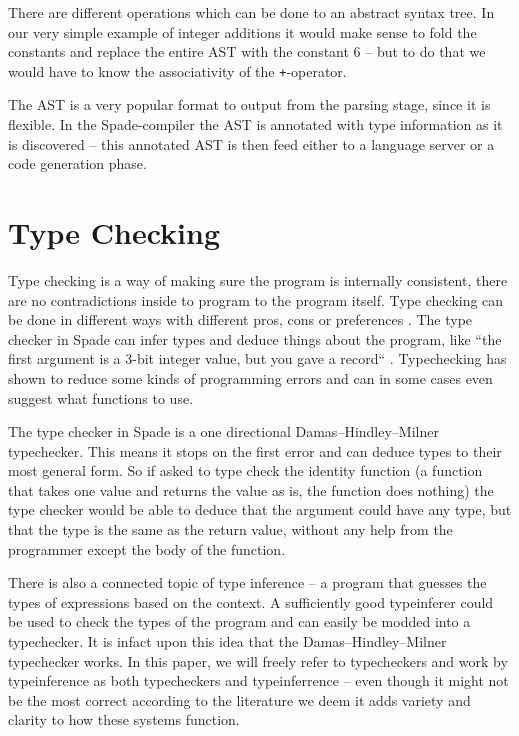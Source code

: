 There are different operations which can be done to an abstract syntax tree. In our very simple example of integer additions it would make sense to fold the constants and replace the entire AST with the constant 6 -- but to do that we would have to know the associativity of the \verb!+!-operator.

The AST is a very popular format to output from the parsing stage, since it is flexible. In the Spade-compiler the AST is annotated with type information as it is discovered -- this annotated AST is then feed either to a language server or a code generation phase.

\section{Type Checking} %
\label{sec:TypeChecking}
Type checking is a way of making sure the program is internally consistent, there are no contradictions inside to program to the program itself. Type checking can be done in different ways with different pros, cons or preferences \cite{src:TypeCheckersBook}. The type checker in Spade can infer types and deduce things about the program, like ``the first argument is a 3-bit integer value, but you gave a record`` \cite{src:spadeAnHDL}. Typechecking has shown to reduce some kinds of programming errors and can in some cases even suggest what functions to use.

The type checker in Spade is a one directional Damas–Hindley–Milner typechecker. This means it stops on the first error and can deduce types to their most general form. So if asked to type check the identity function (a function that takes one value and returns the value as is, the function does nothing) the type checker would be able to deduce that the argument could have any type, but that the type is the same as the return value, without any help from the programmer except the body of the function. \cite{src:DamasHindleyMilner}

There is also a connected topic of type inference -- a program that guesses the types of expressions based on the context. A sufficiently good typeinferer could be used to check the types of the program and can easily be modded into a typechecker. It is infact upon this idea that the Damas–Hindley–Milner typechecker works. In this paper, we will freely refer to typecheckers and work by typeinference as both typecheckers and typeinferrence -- even though it might not be the most correct according to the literature we deem it adds variety and clarity to how these systems function.

